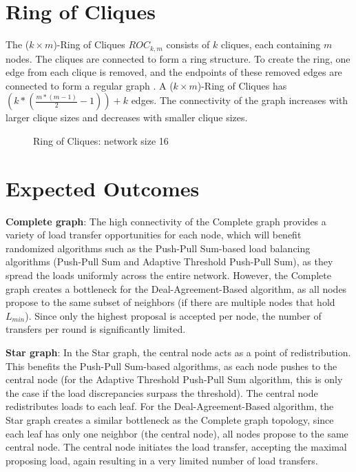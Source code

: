 \section{Ring of Cliques}\label{sec:2ringofcliquegraph}
The ($k \times m$)-Ring of Cliques $ROC_{k,m}$ consists of $k$ cliques, each containing $m$ nodes. The cliques are connected to form a ring structure. To create the ring, one edge from each clique is removed, and the endpoints of these removed edges are connected to form a regular graph \cite{Mahlmann2010}. A ($k \times m$)-Ring of Cliques has $\left( k * \left(\frac{m * (m - 1)}{2}-1 \right) \right)+k$ edges. The connectivity of the graph increases with larger clique sizes and decreases with smaller clique sizes.

\begin{figure}[H]
    \centering
    \scalebox{1}{}
    \caption{Ring of Cliques: network size 16}
    \label{fig:ringofcliquesDemo}
\end{figure}

\section{Expected Outcomes}\label{sec:expectedoutcome}
\textbf{Complete graph}: The high connectivity of the Complete graph provides a variety of load transfer opportunities for each node, which will benefit randomized algorithms such as the Push-Pull Sum-based load balancing algorithms (Push-Pull Sum and Adaptive Threshold Push-Pull Sum), as they spread the loads uniformly across the entire network. However, the Complete graph creates a bottleneck for the Deal-Agreement-Based algorithm, as all nodes propose to the same subset of neighbors (if there are multiple nodes that hold $L_{min}$). Since only the highest proposal is accepted per node, the number of transfers per round is significantly limited.

\textbf{Star graph}: In the Star graph, the central node acts as a point of redistribution. This benefits the Push-Pull Sum-based algorithms, as each node pushes to the central node (for the Adaptive Threshold Push-Pull Sum algorithm, this is only the case if the load discrepancies surpass the threshold). The central node redistributes loads to each leaf. For the Deal-Agreement-Based algorithm, the Star graph creates a similar bottleneck as the Complete graph topology, since each leaf has only one neighbor (the central node), all nodes propose to the same central node. The central node initiates the load transfer, accepting the maximal proposing load, again resulting in a very limited number of load transfers.

